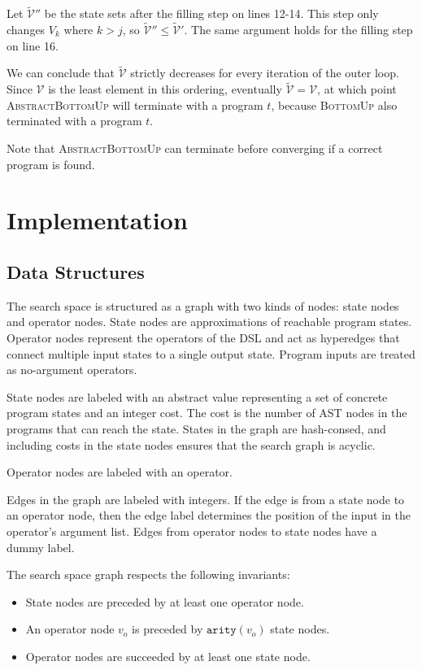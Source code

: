 \documentclass[authordraft,acmsmall,10pt]{acmart}
\newcommand{\abs}[1]{\ensuremath{\widetilde{#1}}}
\begin{document}
Let $\abs{\mathcal{V}}''$ be the state sets after the filling step on lines
12-14. This step only changes $V_k$ where $k > j$, so $\abs{\mathcal{V}}'' \leq
\abs{\mathcal{V}}'$. The same argument holds for the filling step on line 16.

We can conclude that $\abs{\mathcal{V}}$ strictly decreases for every iteration
of the outer loop. Since $\mathcal{V}$ is the least element in this ordering,
eventually $\abs{\mathcal{V}} = \mathcal{V}$, at which point
\textsc{AbstractBottomUp} will terminate with a program $t$, because
\textsc{BottomUp} also terminated with a program $t$.

Note that \textsc{AbstractBottomUp} can terminate before converging if a correct
program is found.


\section{Implementation}
\subsection{Data Structures}

The search space is structured as a graph with two kinds of nodes: state nodes
and operator nodes. State nodes are approximations of reachable program states.
Operator nodes represent the operators of the DSL and act as hyperedges that
connect multiple input states to a single output state. Program inputs are
treated as no-argument operators.

State nodes are labeled with an abstract value representing a set of concrete
program states and an integer cost. The cost is the number of AST nodes in the
programs that can reach the state. States in the graph are hash-consed, and
including costs in the state nodes ensures that the search graph is acyclic.

Operator nodes are labeled with an operator.

Edges in the graph are labeled with integers. If the edge is from a state node
to an operator node, then the edge label determines the position of the input in
the operator's argument list. Edges from operator nodes to state nodes have a
dummy label.

The search space graph respects the following invariants:
\begin{itemize}
\item State nodes are preceded by at least one operator node.
\item An operator node $v_o$ is preceded by $\texttt{arity}(v_o)$ state nodes.
\item Operator nodes are succeeded by at least one state node.
\end{itemize}
\end{document}
